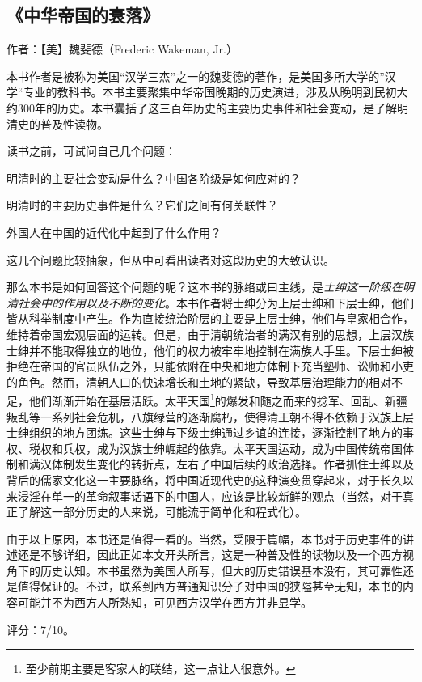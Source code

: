 \subsection{《中华帝国的衰落》}

作者：【美】魏斐德（Frederic Wakeman, Jr.）

本书作者是被称为美国“汉学三杰”之一的魏斐德的著作，是美国多所大学的”汉学“专业的教科书。本书主要聚集中华帝国晚期的历史演进，涉及从晚明到民初大约300年的历史。本书囊括了这三百年历史的主要历史事件和社会变动，是了解明清史的普及性读物。

读书之前，可试问自己几个问题：
\begin{itemize*}
	\item 明清时的主要社会变动是什么？中国各阶级是如何应对的？
	\item 明清时的主要历史事件是什么？它们之间有何关联性？
	\item 外国人在中国的近代化中起到了什么作用？
\end{itemize*}

这几个问题比较抽象，但从中可看出读者对这段历史的大致认识。

那么本书是如何回答这个问题的呢？这本书的脉络或曰主线，是\emph{士绅这一阶级在明清社会中的作用以及不断的变化}。本书作者将士绅分为上层士绅和下层士绅，他们皆从科举制度中产生。作为直接统治阶层的主要是上层士绅，他们与皇家相合作，维持着帝国宏观层面的运转。但是，由于清朝统治者的满汉有别的思想，上层汉族士绅并不能取得独立的地位，他们的权力被牢牢地控制在满族人手里。下层士绅被拒绝在帝国的官员队伍之外，只能依附在中央和地方体制下充当塾师、讼师和小吏的角色。然而，清朝人口的快速增长和土地的紧缺，导致基层治理能力的相对不足，他们渐渐开始在基层活跃。太平天国\footnote{至少前期主要是客家人的联结，这一点让人很意外。}的爆发和随之而来的捻军、回乱、新疆叛乱等一系列社会危机，八旗绿营的逐渐腐朽，使得清王朝不得不依赖于汉族上层士绅组织的地方团练。这些士绅与下级士绅通过乡谊的连接，逐渐控制了地方的事权、税权和兵权，成为汉族士绅崛起的依靠。太平天国运动，成为中国传统帝国体制和满汉体制发生变化的转折点，左右了中国后续的政治选择。作者抓住士绅以及背后的儒家文化这一主要脉络，将中国近现代史的这种演变贯穿起来，对于长久以来浸淫在单一的革命叙事话语下的中国人，应该是比较新鲜的观点（当然，对于真正了解这一部分历史的人来说，可能流于简单化和程式化）。

由于以上原因，本书还是值得一看的。当然，受限于篇幅，本书对于历史事件的讲述还是不够详细，因此正如本文开头所言，这是一种普及性的读物以及一个西方视角下的历史认知。本书虽然为美国人所写，但大的历史错误基本没有，其可靠性还是值得保证的。不过，联系到西方普通知识分子对中国的狭隘甚至无知，本书的内容可能并不为西方人所熟知，可见西方汉学在西方并非显学。

评分：7/10。
